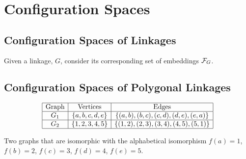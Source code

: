 \section{Configuration Spaces}
\subsection{Configuration Spaces of Linkages}
Given a linkage, $G$, consider its corresponding set of embeddings ${\cal F}_G$.  
\subsection{Configuration Spaces of Polygonal Linkages}

\begin{table}[!ht]
\begin{center}
$$\begin{array}{|c|c|c|}\hline
\text{Graph}&\text{Vertices}&\text{Edges}\\\hline
G_1&\left\lbrace a,b,c,d,e \right\rbrace & \left\lbrace (a,b),(b,c),(c,d),(d,e),(e,a) \right\rbrace 
\\\hline
G_2&\left\lbrace 1,2,3,4,5 \right\rbrace & \left\lbrace (1,2),(2,3),(3,4),(4,5),(5,1) \right\rbrace 
\\\hline
\end{array} $$
\caption{Two graphs that are isomorphic with the alphabetical isomorphism $f(a)=1$, $f(b)=2$, $f(c) 
= 3$, $f(d)=4$, $f(e)=5$.}
\end{center} 
\label{table:linkage-1}
\end{table} 
